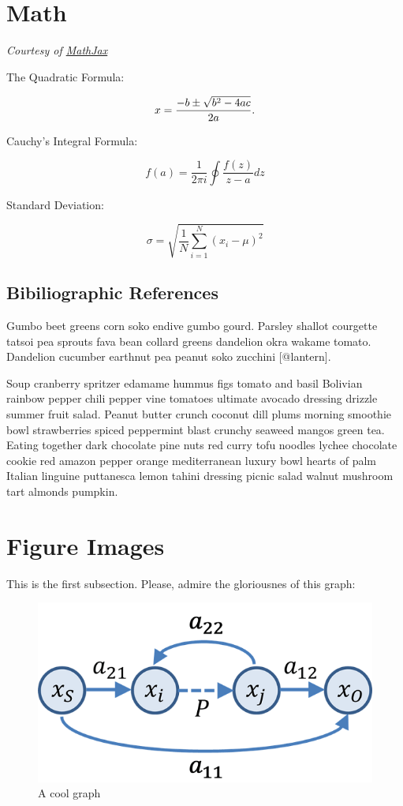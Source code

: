 \documentclass{book}
\begin{document}
\hypertarget{math}{%
\section{Math}\label{math}}

\emph{Courtesy of \href{https://www.mathjax.org/\#samples}{MathJax}}

The Quadratic Formula:

\[x = {-b \pm \sqrt{b^2-4ac} \over 2a}.\]

Cauchy's Integral Formula:

\[f(a) = \frac{1}{2\pi i} \oint\frac{f(z)}{z-a}dz\]

Standard Deviation:

\[\sigma = \sqrt{ \frac{1}{N} \sum_{i=1}^N (x_i -\mu)^2}\]

\hypertarget{bibiliographic-references}{%
\subsection{Bibiliographic References}\label{bibiliographic-references}}

Gumbo beet greens corn soko endive gumbo gourd. Parsley shallot courgette
tatsoi pea sprouts fava bean collard greens dandelion okra wakame tomato.
Dandelion cucumber earthnut pea peanut soko zucchini {[}@lantern{]}.

Soup cranberry spritzer edamame hummus figs tomato and basil Bolivian rainbow
pepper chili pepper vine tomatoes ultimate avocado dressing drizzle summer
fruit salad. Peanut butter crunch coconut dill plums morning smoothie bowl
strawberries spiced peppermint blast crunchy seaweed mangos green tea. Eating
together dark chocolate pine nuts red curry tofu noodles lychee chocolate
cookie red amazon pepper orange mediterranean luxury bowl hearts of palm
Italian linguine puttanesca lemon tahini dressing picnic salad walnut mushroom
tart almonds pumpkin.

\hypertarget{figure-images}{%
\section{Figure Images}\label{figure-images}}

This is the first subsection. Please, admire the gloriousnes of this graph:

\begin{figure}
\hypertarget{fig:graph}{%
\centering
\includegraphics{graph.png}
\caption{A cool graph}\label{fig:graph}
}
\end{figure}
\end{document}

